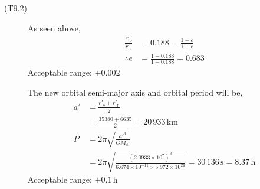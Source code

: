 \begin{description}
\item[(T9.2)]
As seen above,
\begin{align*}
\frac{r'_{\mathrm{p}}}{r'_{\mathrm{a}}} &= 0.188 = \frac{1-e}{1+e} \\
\therefore e &= \frac{1 - 0.188}{1 + 0.188} = \boxed{0.683}
\end{align*}
Acceptable range: $\pm 0.002$

The new orbital semi-major axis and orbital period will be,
\begin{align*}
a' &= \frac{r'_{\mathrm{a}} + r'_{\mathrm{p}}}{2} \\
   &= \frac{35380 + 6635}{2} = 20\,933\,\mathrm{km} \\
P &= 2\pi\sqrt{\frac{a'^3}{GM_\oplus}} \\
  &= 2\pi\sqrt{\frac{(2.0933 \times 10^{7})^3}
     {6.674 \times 10^{-11} \times 5.972 \times 10^{24}}}
   = \boxed{30\,136\,\mathrm{s} = 8.37\,\mathrm{h}}
\end{align*}
Acceptable range: $\pm 0.1$\,h
\end{description}
